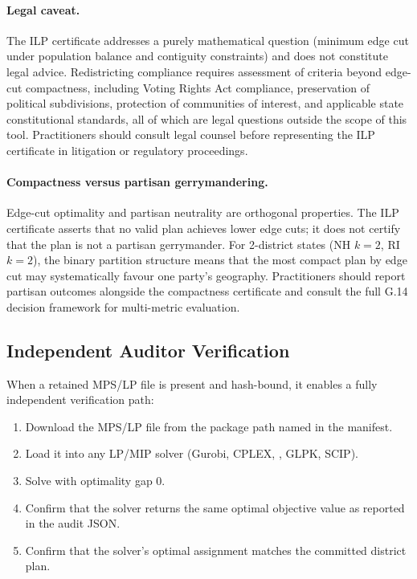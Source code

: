 \paragraph{Legal caveat.}
The ILP certificate addresses a purely mathematical question (minimum
edge cut under population balance and contiguity constraints) and does not
constitute legal advice.
Redistricting compliance requires assessment of criteria beyond edge-cut
compactness, including Voting Rights Act compliance, preservation of
political subdivisions, protection of communities of interest, and
applicable state constitutional standards, all of which are legal questions
outside the scope of this tool.
Practitioners should consult legal counsel before representing the ILP
certificate in litigation or regulatory proceedings.

\paragraph{Compactness versus partisan gerrymandering.}
Edge-cut optimality and partisan neutrality are orthogonal properties.
The ILP certificate asserts that no valid plan achieves lower edge cuts;
it does not certify that the plan is not a partisan gerrymander.
For 2-district states (NH $k=2$, RI $k=2$), the binary partition structure
means that the most compact plan by edge cut may systematically favour one
party's geography.
Practitioners should report partisan outcomes alongside the compactness
certificate and consult the full G.14 decision framework for multi-metric
evaluation.

\subsection{Independent Auditor Verification}

When a retained MPS/LP file is present and hash-bound, it enables a fully
independent verification path:

\begin{enumerate}
\item Download the MPS/LP file from the package path named in the manifest.
\item Load it into any LP/MIP solver (Gurobi, CPLEX, \highs{}, GLPK, SCIP).
\item Solve with optimality gap 0.
\item Confirm that the solver returns the same optimal objective value
  as reported in the audit JSON.
\item Confirm that the solver's optimal assignment matches the committed
  district plan.
\end{enumerate}

